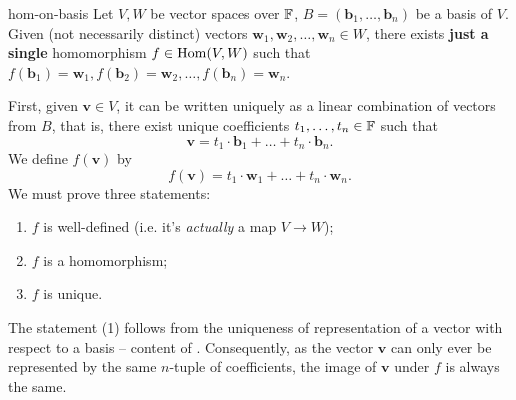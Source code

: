 \begin{theorem}{}{hom-on-basis}
 Let $V,W$ be vector spaces over $\mathbb{F}$, $B = (\mathbf{b}_1,\ldots,\mathbf{b}_n)$
 be a basis of $V$. Given (not necessarily distinct) vectors
 $\mathbf{w}_1,\mathbf{w}_2,\ldots,\mathbf{w}_n \in W$, there exists
 \textbf{just a single} homomorphism $f \in \operatorname{Hom}(V,W)$ such that
 $f(\mathbf{b}_1) = \mathbf{w}_1, f(\mathbf{b}_2) =
 \mathbf{w}_2,\ldots,f(\mathbf{b}_n) = \mathbf{w}_n$.
\end{theorem}
\begin{thmproof}
 First, given $\mathbf{v} \in V$, it can be written uniquely as a linear
 combination of vectors from $B$, that is, there exist unique coefficients
 $t_1,\ldots,t_n \in \mathbb{F}$ such that
 \[
  \mathbf{v} = t_1 \cdot \mathbf{b}_1 + \ldots + t_n \cdot \mathbf{b}_n.
 \]
 We define $f(\mathbf{v})$ by
 \[
  f(\mathbf{v}) = t_1 \cdot \mathbf{w}_1 + \ldots + t_n \cdot \mathbf{w}_n.
 \]
 We must prove three statements:
 \begin{enumerate}
  \item $f$ is well-defined (i.e. it's \emph{actually} a map $V \to W$);
  \item $f$ is a homomorphism;
  \item $f$ is unique.
 \end{enumerate}
 The statement (1) follows from the uniqueness of representation of a vector
 with respect to a basis -- content of
 . Consequently, as the vector
 $\mathbf{v}$ can only ever be represented by the same $n$-tuple of
 coefficients, the image of $\mathbf{v}$ under $f$ is always the same.


\end{thmproof}
